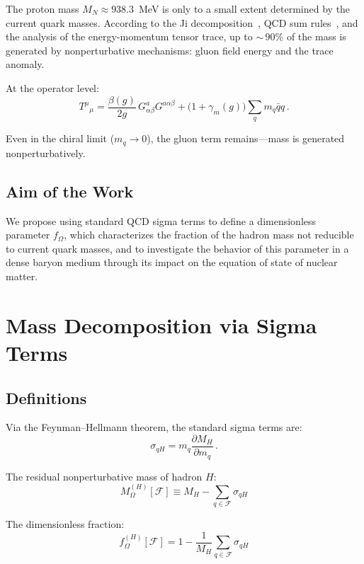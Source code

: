 \documentclass[11pt,a4paper]{article}
\begin{document}
The proton mass $M_N \approx 938.3$~MeV is only to a small extent determined by the current quark masses. According to the Ji decomposition~\cite{Ji1995}, QCD sum rules~\cite{SVZ1979}, and the analysis of the energy-momentum tensor trace, up to ${\sim}\,90\%$ of the mass is generated by nonperturbative mechanisms: gluon field energy and the trace anomaly.

At the operator level:
\begin{equation}
T^{\mu}{}_{\mu} = \frac{\beta(g)}{2g}\, G^a_{\alpha\beta} G^{a\alpha\beta} + \bigl(1+\gamma_m(g)\bigr) \sum_q m_q \bar{q} q\,.
\label{eq:trace}
\end{equation}

Even in the chiral limit ($m_q \to 0$), the gluon term remains---mass is generated nonperturbatively.

\subsection{Aim of the Work}

We propose using standard QCD sigma terms to define a dimensionless parameter $f_\Omega$, which characterizes the fraction of the hadron mass not reducible to current quark masses, and to investigate the behavior of this parameter in a dense baryon medium through its impact on the equation of state of nuclear matter.

\section{Mass Decomposition via Sigma Terms}
\label{sec:decomposition}

\subsection{Definitions}

Via the Feynman--Hellmann theorem, the standard sigma terms are:
\begin{equation}
\sigma_{qH} = m_q \frac{\partial M_H}{\partial m_q}\,.
\end{equation}

The residual nonperturbative mass of hadron $H$:
\begin{equation}
\boxed{\;M_\Omega^{(H)}[\mathcal{F}] \equiv M_H - \sum_{q \in \mathcal{F}} \sigma_{qH}\;}
\end{equation}

The dimensionless fraction:
\begin{equation}
\boxed{\;f_\Omega^{(H)}[\mathcal{F}] = 1 - \frac{1}{M_H} \sum_{q \in \mathcal{F}} \sigma_{qH}\;}
\end{equation}
\end{document}
